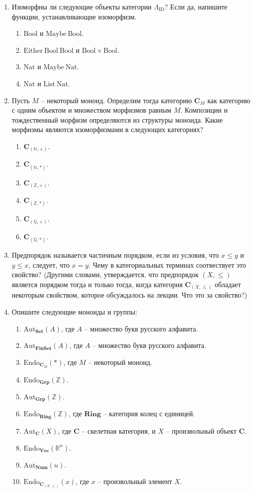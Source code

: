 \documentclass[draft]{article}
\newcommand{\cat}[1]{\mathbf{#1}}
\renewcommand{\C}{\cat{C}}
\newcommand{\Set}{\cat{Set}}
\newcommand{\FinSet}{\cat{FinSet}}
\newcommand{\Grp}{\cat{Grp}}
\newcommand{\Vec}{\cat{Vec}}
\newcommand{\Num}{\cat{Num}}
\newcommand{\fs}[1]{\mathrm{#1}}
\begin{document}
\begin{enumerate}

\item Изоморфны ли следующие объекты категории $\Lambda_\fs{ID}$? Если да, напишите функции, устанавливающие изоморфизм.
\begin{enumerate}
\item $\fs{Bool}$ и $\fs{Maybe\ Bool}$.
\item $\fs{Either\ Bool\ Bool}$ и $\fs{Bool} \times \fs{Bool}$.
\item $\fs{Nat}$ и $\fs{Maybe\ Nat}$.
\item $\fs{Nat}$ и $\fs{List\ Nat}$.
\end{enumerate}

\item Пусть $M$ -- некоторый моноид.
Определим тогда категорию $\C_M$ как категорию с одним объектом и множеством морфизмов равным $M$.
Композиции и тождественный морфизм определяются из структуры моноида.
Какие морфизмы являются изоморфизмами в следующих категориях?
\begin{enumerate}
\item $\C_{(\mathbb{N},+)}$.
\item $\C_{(\mathbb{N},*)}$.
\item $\C_{(\mathbb{Z},+)}$.
\item $\C_{(\mathbb{Z},*)}$.
\item $\C_{(\mathbb{Q},+)}$.
\item $\C_{(\mathbb{Q},*)}$.
\end{enumerate}

\item Предпорядок называется частичным порядком, если из условия, что $x \leq y$ и $y \leq x$, следует, что $x = y$.
Чему в категориальных терминах соотвествует это свойство?
(Другими словами, утверждается, что предпорядок $(X,\leq)$ является порядком тогда и только тогда, когда категория $\C_{(X,\leq)}$ обладает некоторым свойством,
которое обсуждалось на лекции. Что это за свойство?)

\item Опишите следующие моноиды и группы:
\begin{enumerate}
\item $\fs{Aut}_\Set(A)$, где $A$ -- множество букв русского алфавита.
\item $\fs{Aut}_{\FinSet}(A)$, где $A$ -- множество букв русского алфавита.
\item $\fs{Endo}_{\C_M}(*)$, где $M$ -- некоторый моноид.
\item $\fs{Endo}_\Grp(\mathbb{Z})$.
\item $\fs{Aut}_\Grp(\mathbb{Z})$.
\item $\fs{Endo}_\cat{Ring}(\mathbb{Z})$, где $\cat{Ring}$ -- категория колец с единицей.
\item $\fs{Aut}_\C(X)$, где $\C$ -- скелетная категория, и $X$ -- произвольный объект $\C$.
\item $\fs{Endo}_\Vec(\mathbb{R}^n)$.
\item $\fs{Aut}_\Num(n)$.
\item $\fs{Endo}_{\C_{(X,\leq)}}(x)$, где $x$ -- произвольный элемент $X$.
\end{enumerate}


\end{enumerate}
\end{document}
